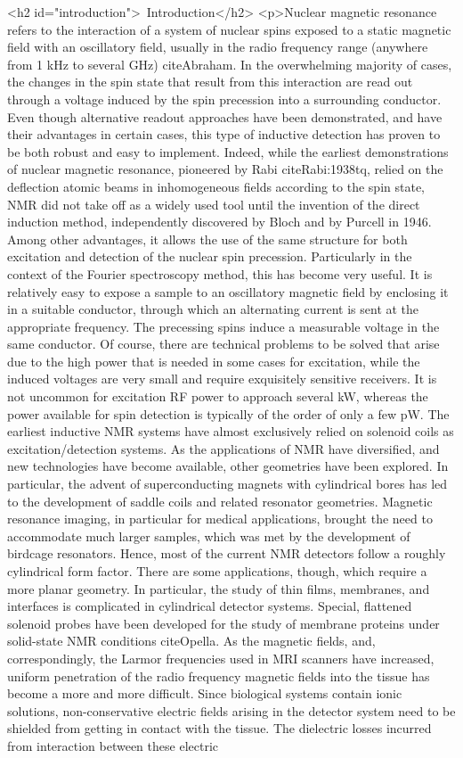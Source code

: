 <h2 id="introduction"> Introduction</h2>
<p>Nuclear magnetic resonance refers to the interaction of a system of nuclear spins exposed to a static magnetic field with an oscillatory field, usually in the radio frequency range (anywhere from 1 kHz to several GHz) cite{Abraham}. In the overwhelming majority of cases, the changes in the spin state that result from this interaction are read out through a voltage induced by the spin precession into a surrounding conductor. Even though alternative readout approaches have been demonstrated, and have their advantages in certain cases, this type of inductive detection has proven to be both robust and easy to implement. Indeed, while the earliest demonstrations of nuclear magnetic resonance, pioneered by Rabi cite{Rabi:1938tq}, relied on the deflection atomic beams in inhomogeneous fields according to the spin state, NMR did not take off as a widely used tool until the invention of the direct induction method, independently discovered by Bloch and by Purcell in 1946. Among other advantages, it allows the use of the same structure for both excitation and detection of the nuclear spin precession. Particularly in the context of the Fourier spectroscopy method, this has become very useful. It is relatively easy to expose a sample to an oscillatory magnetic field by enclosing it in a suitable conductor, through which an alternating current is sent at the appropriate frequency. The precessing spins induce a measurable voltage in the same conductor. Of course, there are technical problems to be solved that arise due to the high power that is needed in some cases for excitation, while the induced voltages are very small and require exquisitely sensitive receivers. It is not uncommon for excitation RF power to approach several kW, whereas the power available for spin detection is typically of the order of only a few pW. The earliest inductive NMR systems have almost exclusively relied on solenoid coils as excitation/detection systems. As the applications of NMR have diversified, and new technologies have become available, other geometries have been explored. In particular, the advent of superconducting magnets with cylindrical bores has led to the development of saddle coils and related resonator geometries. Magnetic resonance imaging, in particular for medical applications, brought the need to accommodate much larger samples, which was met by the development of birdcage resonators. Hence, most of the current NMR detectors follow a roughly cylindrical form factor. There are some applications, though, which require a more planar geometry. In particular, the study of thin films, membranes, and interfaces is complicated in cylindrical detector systems. Special, flattened solenoid probes have been developed for the study of membrane proteins under solid-state NMR conditions cite{Opella}. As the magnetic fields, and, correspondingly, the Larmor frequencies used in MRI scanners have increased, uniform penetration of the radio frequency magnetic fields into the tissue has become a more and more difficult. Since biological systems contain ionic solutions, non-conservative electric fields arising in the detector system need to be shielded from getting in contact with the tissue. The dielectric losses incurred from interaction between these electric 